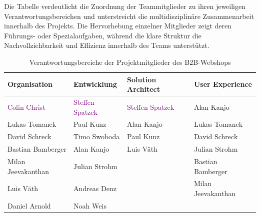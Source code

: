 \documentclass[%
	12pt,
	a4paper,
	oneside,
	parskip=full
]{scrbook}
\begin{document}
Die Tabelle verdeutlicht die Zuordnung der Teammitglieder zu ihren jeweiligen Verantwortungsbereichen und unterstreicht die multidisziplinäre Zusammenarbeit innerhalb des Projekts.
Die Hervorhebung einzelner Mitglieder zeigt deren Führungs- oder Spezialaufgaben, während die klare Struktur die Nachvollziehbarkeit und Effizienz innerhalb des Teams unterstützt.
\begin{table}[ht]
	\centering
	\begin{tabular}{l|l|l|l}
		 \textbf{Organisation}   &    \textbf{Entwicklung}     & \textbf{Solution Architect} & \textbf{User Experience} \\ \hline
		\textcolor{purple}{Colin Christ} & \textcolor{purple}{Steffen Spatzek} & \textcolor{purple}{Steffen Spatzek} &        Alan Kanjo        \\ \hline
		     Lukas Tomanek       &          Paul Kunz          &         Alan Kanjo          &      Lukas Tomanek       \\ \hline
		     David Schreck       &        Timo Swoboda         &          Paul Kunz          &      David Schreck       \\ \hline
		   Bastian Bamberger     &         Alan Kanjo          &          Luis Väth          &      Julian Strohm       \\ \hline
		   Milan Jeevakanthan    &        Julian Strohm        &                             &    Bastian Bamberger     \\ \hline
		       Luis Väth         &        Andreas Denz         &                             &    Milan Jeevakanthan    \\ \hline
		     Daniel Arnold       &          Noah Weis          &                             &
	\end{tabular}
	\caption{Verantwortungsbereiche der Projektmitglieder des B2B-Webshops}
	\label{tab:teamstruktur}
\end{table}

\tableofcontents
\end{document}
